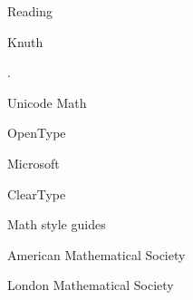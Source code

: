 \documentclass[11pt]{PalisadesLakesBook}
\begin{document}
\begin{plSection}{Reading}
\begin{plSection}{Knuth}


.


\end{plSection}%
\begin{plSection}{Unicode Math}\label{sec:UnicodeMath}


\end{plSection}%
\begin{plSection}{OpenType}\label{sec:OpenType}


\end{plSection}%
\begin{plSection}{Microsoft}


\begin{plSection}{ClearType}\label{sec:ClearType}
\end{plSection}%
\end{plSection}%
\begin{plSection}{Math style guides}
\begin{plSection}{American Mathematical Society}



\end{plSection}%
\begin{plSection}{London Mathematical Society}



\end{plSection}
\end{plSection}
\end{plSection}
\end{document}
